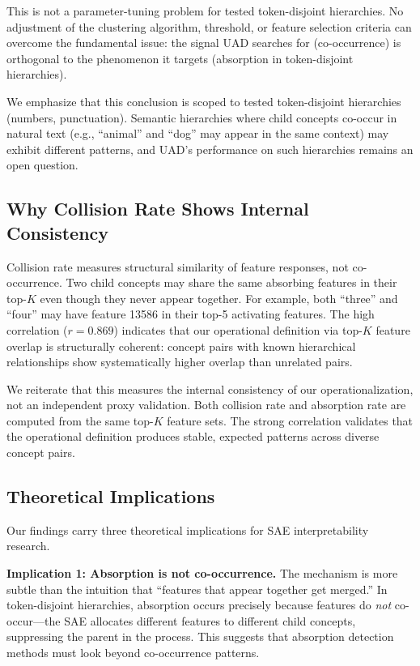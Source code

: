 \documentclass{article}
\begin{document}
This is not a parameter-tuning problem for tested token-disjoint hierarchies. No adjustment of the clustering algorithm, threshold, or feature selection criteria can overcome the fundamental issue: the signal UAD searches for (co-occurrence) is orthogonal to the phenomenon it targets (absorption in token-disjoint hierarchies).

We emphasize that this conclusion is scoped to tested token-disjoint hierarchies (numbers, punctuation). Semantic hierarchies where child concepts co-occur in natural text (e.g., ``animal'' and ``dog'' may appear in the same context) may exhibit different patterns, and UAD's performance on such hierarchies remains an open question.

\subsection{Why Collision Rate Shows Internal Consistency}

Collision rate measures structural similarity of feature responses, not co-occurrence. Two child concepts may share the same absorbing features in their top-$K$ even though they never appear together. For example, both ``three'' and ``four'' may have feature 13586 in their top-5 activating features. The high correlation ($r = 0.869$) indicates that our operational definition via top-$K$ feature overlap is structurally coherent: concept pairs with known hierarchical relationships show systematically higher overlap than unrelated pairs.

We reiterate that this measures the internal consistency of our operationalization, not an independent proxy validation. Both collision rate and absorption rate are computed from the same top-$K$ feature sets. The strong correlation validates that the operational definition produces stable, expected patterns across diverse concept pairs.

\subsection{Theoretical Implications}

Our findings carry three theoretical implications for SAE interpretability research.

\textbf{Implication 1: Absorption is not co-occurrence.}
The mechanism is more subtle than the intuition that ``features that appear together get merged.'' In token-disjoint hierarchies, absorption occurs precisely because features do \emph{not} co-occur---the SAE allocates different features to different child concepts, suppressing the parent in the process. This suggests that absorption detection methods must look beyond co-occurrence patterns.
\end{document}
